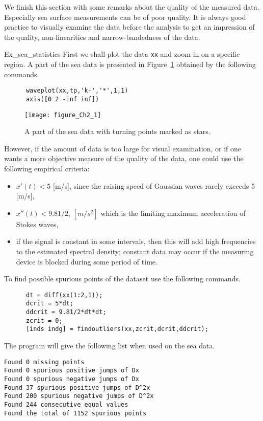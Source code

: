 We finish this section with some remarks about the quality
of the measured data. Especially sea surface measurements can be
of poor quality.
It is always good practice to visually examine the data
before the analysis to get an impression of the quality,
non-linearities and narrow-bandedness of the data.

\begin{cex}{Ex_sea_statistics}\label{page:spurious}
First we shall plot the data {\tt xx} and zoom in on a specific region.
A part of the sea data is presented in Figure~\ref{fig2-1}
obtained by the following commands.
 {\small\begin{verbatim}
      waveplot(xx,tp,'k-','*',1,1)
      axis([0 2 -inf inf])
\end{verbatim}}

\begin{figure}
\centering
\texttt{[image: figure\_Ch2\_1]}
\vspace{-3mm}
\caption[Plotting sea data and local turning points]{A part of
the sea data with turning points marked as stars.}
\label{fig2-1}
\end{figure}

However, if the amount of data is too large for visual examination, or
if one wants a more objective measure of the quality of
the data, one could use the following empirical criteria:
\begin{itemize}\setlength\itemsep{-1mm}
\item $x'(t) < 5$ [m/s], since the raising speed of
Gaussian waves rarely exceeds 5 [m/s],
\item $x''(t) < 9.81/2$, $[m/s^2]$ which is the limiting maximum
acceleration of Stokes waves,
\item if the signal is constant in some intervals, then this will add high
frequencies to the estimated spectral density; constant data may occur if
the measuring device is blocked during some period of time.
\end{itemize}

\noindent
To find possible spurious points of the dataset use the following commands.
{\small\begin{verbatim}
      dt = diff(xx(1:2,1));
      dcrit = 5*dt;
      ddcrit = 9.81/2*dt*dt;
      zcrit = 0;
      [inds indg] = findoutliers(xx,zcrit,dcrit,ddcrit);
\end{verbatim}}

\noindent
The program will give the following list when used on the sea data.
{\small\begin{verbatim}
Found 0 missing points
Found 0 spurious positive jumps of Dx
Found 0 spurious negative jumps of Dx
Found 37 spurious positive jumps of D^2x
Found 200 spurious negative jumps of D^2x
Found 244 consecutive equal values
Found the total of 1152 spurious points
\end{verbatim}}


\end{cex}
